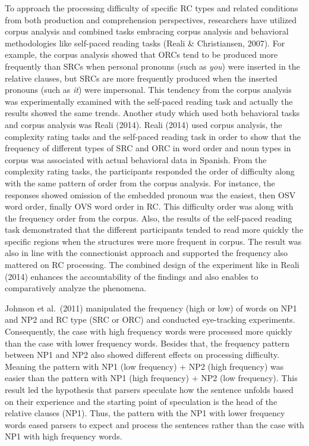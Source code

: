 \documentclass[
]{article}
\begin{document}
To approach the processing difficulty of specific RC types and related
conditions from both production and comprehension perspectives,
researchers have utilized corpus analysis and combined tasks embracing
corpus analysis and behavioral methodologies like self-paced reading
tasks (Reali \& Christiansen, 2007). For example, the corpus analysis
showed that ORCs tend to be produced more frequently than SRCs when
personal pronouns (such as \emph{you}) were inserted in the relative
clauses, but SRCs are more frequently produced when the inserted
pronouns (such as \emph{it}) were impersonal. This tendency from the
corpus analysis was experimentally examined with the self-paced reading
task and actually the results showed the same trends. Another study
which used both behavioral tasks and corpus analysis was Reali (2014).
Reali (2014) used corpus analysis, the complexity rating tasks and the
self-paced reading task in order to show that the frequency of different
types of SRC and ORC in word order and noun types in corpus was
associated with actual behavioral data in Spanish. From the complexity
rating tasks, the participants responded the order of difficulty along
with the same pattern of order from the corpus analysis. For instance,
the responses showed omission of the embedded pronoun was the easiest,
then OSV word order, finally OVS word order in RC. This difficulty order
was along with the frequency order from the corpus. Also, the results of
the self-paced reading task demonstrated that the different participants
tended to read more quickly the specific regions when the structures
were more frequent in corpus. The result was also in line with the
connectionist approach and supported the frequency also mattered on RC
processing. The combined design of the experiment like in Reali (2014)
enhances the accountability of the findings and also enables to
comparatively analyze the phenomena.

Johnson et al.~(2011) manipulated the frequency (high or low) of words
on NP1 and NP2 and RC type (SRC or ORC) and conducted eye-tracking
experiments. Consequently, the case with high frequency words were
processed more quickly than the case with lower frequency words. Besides
that, the frequency pattern between NP1 and NP2 also showed different
effects on processing difficulty. Meaning the pattern with NP1 (low
frequency) + NP2 (high frequency) was easier than the pattern with NP1
(high frequency) + NP2 (low frequency). This result led the hypothesis
that parsers speculate how the sentence unfolds based on their
experience and the starting point of speculation is the head of the
relative clauses (NP1). Thus, the pattern with the NP1 with lower
frequency words eased parsers to expect and process the sentences rather
than the case with NP1 with high frequency words.
\end{document}
